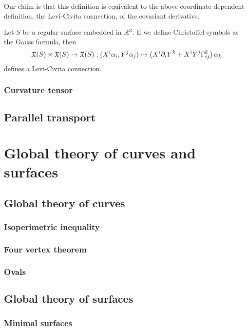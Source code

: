 \documentclass{../note}
\def\a{\alpha}
\begin{document}
Our claim is that this definition is equivalent to the above coordinate dependent definition, the Levi-Civita connection, of the covariant derivative.

\begin{prop}
Let $S$ be a regular surface embedded in $\mathbb{R}^3$.
If we define Christoffel symbols as the Gauss formula, then
\[\fX(S)\times\fX(S)\to\fX(S):(X^i\a_i,Y^j\a_j)\mapsto\left(X^i\pd_iY^k+X^iY^j\Gamma_{ij}^k\right)\a_k\]
defines a Levi-Civita connection.
\end{prop}

\section{Curvature tensor}



\chapter{Parallel transport}






\part{Global theory of curves and surfaces}

\chapter{Global theory of curves}
\section{Isoperimetric inequality}
\section{Four vertex theorem}
\section{Ovals}


\chapter{Global theory of surfaces}
\section{Minimal surfaces}
\end{document}
